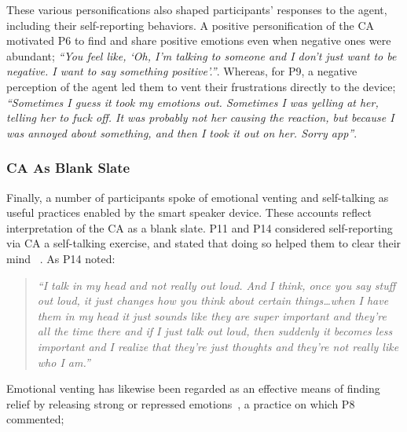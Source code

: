             These various personifications also shaped participants' responses to the agent, including their self-reporting behaviors. A positive personification of the \ac{CA} motivated P6 to find and share positive emotions even when negative ones were abundant; \textit{``You feel like, `Oh, I'm talking to someone and I don't just want to be negative. I want to say something positive'.''}. Whereas, for P9, a negative perception of the agent led them to vent their frustrations directly to the device; \textit{``Sometimes I guess it took my emotions out. Sometimes I was yelling at her, telling her to fuck off. It was probably not her causing the reaction, but because I was annoyed about something, and then I took it out on her. Sorry \acl{app}''}.
      
        \subsubsection{\ac{CA} As Blank Slate} %
     
            Finally, a number of participants spoke of emotional venting and self-talking as useful practices enabled by the smart speaker device. These accounts reflect interpretation of the \ac{CA} as a blank slate. P11 and P14 considered self-reporting via \ac{CA} a self-talking exercise, and stated that doing so helped them to clear their mind ~\cite{callicott2003effects,kendall1991guiding,treadwell1996self}. As P14 noted:
            
                \begin{quote}
                \vspace{2mm}
                    \textit{``I talk in my head and not really out loud. And I think, once you say stuff out loud, it just changes how you think about certain things\ldots when I have them in my head it just sounds like they are super important and they're all the time there and if I just talk out loud, then suddenly it becomes less important and I realize that they're just thoughts and they're not really like who I am.''} %
                \vspace{2mm}
                \end{quote} 
            
            Emotional venting has likewise been regarded as an effective means of finding relief by releasing strong or repressed emotions~\cite{bennett1991irrationality, tonnaer2020explosive, leslie2008boxing}, a practice on which P8 commented;
            
